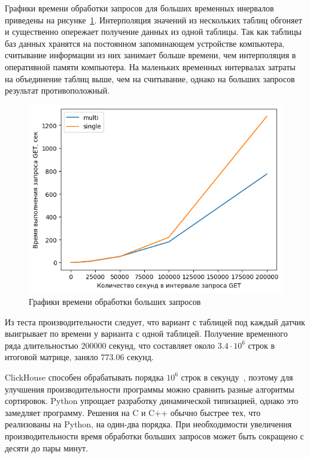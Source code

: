 Графики времени обработки запросов для больших временных инервалов приведены на рисунке~\ref{bench2e5}. Интерполяция значений из нескольких таблиц обгоняет и существенно опережает получение данных из одной таблицы. Так как таблицы баз данных хранятся на постоянном запоминающем устройстве компьютера, считывание информации из них занимает больше времени, чем интерполяция в оперативной памяти компьютера. На маленьких временных интервалах затраты на объединение таблиц выше, чем на считывание, однако на больших запросов результат противоположный.

\begin{figure}
    \includegraphics[scale=1.0]{img/bench2e5.png}
    \caption{Графики времени обработки больших запросов}
    \label{bench2e5}
\end{figure}

Из теста производительности следует, что вариант с таблицей под каждый датчик выигрывает по времени у варианта с одной таблицей. Получение временного ряда длительностью $200000$ секунд, что составляет около $3.4 \cdot {10} ^ {6}$ строк в итоговой матрице, заняло $773.06$ секунд.

ClickHouse способен обрабатывать порядка ${10} ^ {6}$ строк в секунду~\cite{ch-perfomance}, поэтому для улучшения производительности программы можно сравнить разные алгоритмы сортировок. Python упрощает разработку динамической типизацией, однако это замедляет программу. Решения на C и C++ обычно быстрее тех, что реализованы на Python, на один-два порядка. При необходимости увеличения производительности время обработки больших запросов может быть сокращено с десяти до пары минут.
